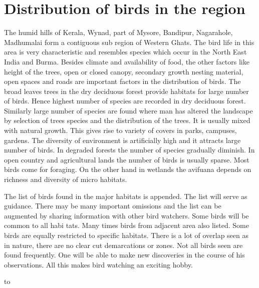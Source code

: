 \chapter{Distribution of birds in the region}

The humid hills of Kerala, Wynad, part of Mysore, Bandipur, 
Nagarahole, Madhumalai form a contiguous sub region of Western 
Ghats. The bird life in this area is very characteristic and 
resembles species which occur in the North East India and Burma. 
Besides climate and availability of food, the other factors like 
height of the trees, open or closed canopy, secondary growth 
nesting material, open spaces and roads are important factors in 
the distribution of birds. The broad leaves trees in the dry 
deciduous forest provide habitats for large number of birds. 
Hence highest number of species are recorded in dry deciduous 
forest. Similarly large number of species are found where man has 
altered the landscape by selection of trees species and the 
distribution of the trees. It is usually mixed with natural 
growth. This gives rise to variety of covers in parks, campuses, 
gardens. The diversity of environment is artificially high and it 
attracts large number of birds. In degraded forests the number of 
species gradually diminish. In open country and agricultural 
lands the number of birds is usually sparse. Most birds come for 
foraging. On the other hand in wetlands the avifuana depends on 
richness and diversity of micro habitats. 

The list of birds found in the major habitats is appended. 
The list will serve as guidance. There may be many important 
omissions and the list can be augmented by sharing information 
with other bird watchers. Some birds will be common to all habi
tats. Many times birds from adjacent area also listed. Some birds 
are equally restricted to specific habitats. There is a lot of 
overlap seen as in nature, there are no clear cut demarcations or 
zones. Not all birds seen are found frequently. One will be able 
to make new discoveries in the course of his observations. All 
this makes bird watching an exciting hobby. 

\thispagestyle{empty}

\vbox to


\setcounter{chapter}{4}


